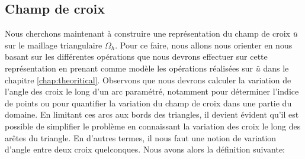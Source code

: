 \subsection{Champ de croix}

Nous cherchons maintenant à construire une représentation du champ de croix $\bar{u}$ sur le maillage triangulaire $\Omega_h$. Pour ce faire, nous allons nous orienter en nous basant sur les différentes opérations que nous devrons effectuer sur cette représentation en prenant comme modèle les opérations réalisées sur $\bar{u}$ dans le chapitre \ref{chap:theoritical}. Observons que nous devrons calculer la variation de l'angle des croix le long d'un arc paramétré, notamment pour déterminer l'indice de points ou pour quantifier la variation du champ de croix dans une partie du domaine. En limitant ces arcs aux bords des triangles, il devient évident qu'il est possible de simplifier le problème en connaissant la variation des croix le long des arêtes du triangle. En d'autres termes, il nous faut une notion de variation d'angle entre deux croix quelconques. Nous avons alors la définition suivante:

